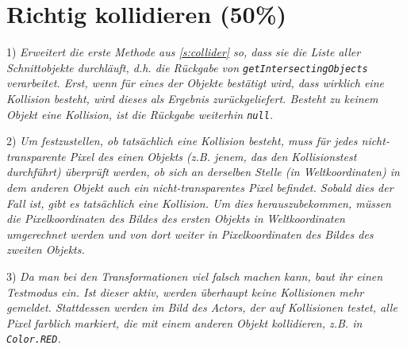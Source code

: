 \documentclass{../pi1-musterloesung}
\begin{document}
\section{Richtig kollidieren (50\%)}

1) \emph{Erweitert die erste Methode aus \ref{s:collider} so, dass sie die Liste aller Schnittobjekte durchläuft, d.h. die Rückgabe von \texttt{getIntersectingObjects} verarbeitet. Erst, wenn für eines der Objekte bestätigt wird, dass wirklich eine Kollision besteht, wird dieses als Ergebnis zurückgeliefert. Besteht zu keinem Objekt eine Kollision, ist die Rückgabe weiterhin \texttt{null}.}




2) \emph{Um festzustellen, ob tatsächlich eine Kollision besteht, muss für jedes nicht-transparente Pixel des einen Objekts (z.B. jenem, das den Kollisionstest durchführt) überprüft werden, ob sich an derselben Stelle (in Weltkoordinaten) in dem anderen Objekt auch ein nicht-transparentes Pixel befindet. Sobald dies der Fall ist, gibt es tatsächlich eine Kollision. Um dies herauszubekommen, müssen die Pixelkoordinaten des Bildes des ersten Objekts in Weltkoordinaten umgerechnet werden und von dort weiter in Pixelkoordinaten des Bildes des zweiten Objekts.}






3) \emph{Da man bei den Transformationen viel falsch machen kann, baut ihr einen Testmodus ein. Ist dieser aktiv, werden überhaupt keine Kollisionen mehr gemeldet. Stattdessen werden im Bild des Actors, der auf Kollisionen testet, alle Pixel farblich markiert, die mit einem anderen Objekt kollidieren, z.B. in \texttt{Color.RED}.}






\end{document}

